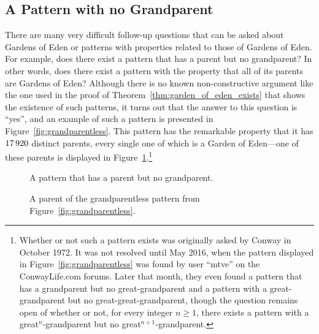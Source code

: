 \subsection{A Pattern with no Grandparent}\label{sec:no_grandparent}

There are many very difficult follow-up questions that can be asked about Gardens of Eden or patterns with properties related to those of Gardens of Eden. For example, does there exist a pattern that has a parent but no grandparent? In other words, does there exist a pattern with the property that all of its parents are Gardens of Eden? Although there is no known non-constructive argument like the one used in the proof of Theorem~\ref{thm:garden_of_eden_exists} that shows the existence of such patterns, it turns out that the answer to this question is ``yes'', and an example of such a pattern is presented in Figure~\ref{fig:grandparentless}. This pattern has the remarkable property that it has $17{\,}920$ distinct parents, every single one of which is a Garden of Eden---one of these parents is displayed in Figure~\ref{fig:grandparentless_parent}.\footnote{Whether or not such a pattern exists was originally asked by Conway in October 1972. It was not resolved until May 2016, when the pattern displayed in Figure~\ref{fig:grandparentless} was found by user ``mtve'' on the ConwayLife.com forums. Later that month, they even found a pattern that has a grandparent but no great-grandparent and a pattern with a great-grandparent but no great-great-grandparent, though the question remains open of whether or not, for every integer $n \geq 1$, there exists a pattern with a great$^n$-grandparent but no great$^{n+1}$-grandparent.}

\begin{figure}[!htb]
	\centering
	\begin{minipage}[b]{.48\textwidth}
		\centering\vspace*{0.11cm}
		\caption{A pattern that has a parent but no grandparent.}\label{fig:grandparentless}
	\end{minipage} \quad %
	\begin{minipage}[b]{.48\textwidth}
		\centering
		\caption{A parent of the grandparentless pattern from Figure~\ref{fig:grandparentless}.}\label{fig:grandparentless_parent}
	\end{minipage}
\end{figure}

